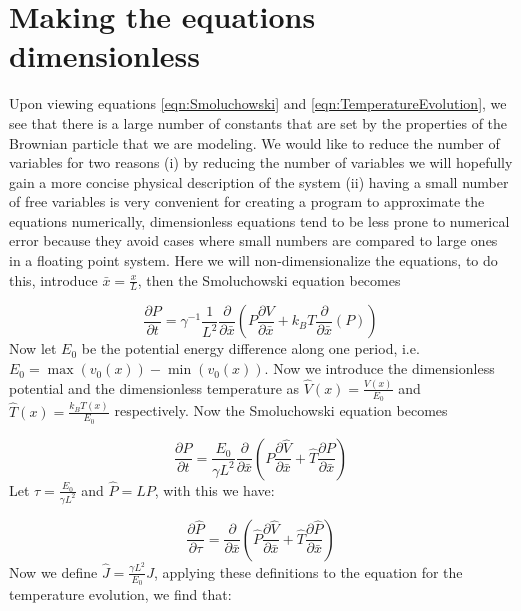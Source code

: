 \section{Making the equations dimensionless}  \label{dimensionless}

Upon viewing equations \ref{eqn:Smoluchowski} and \ref{eqn:TemperatureEvolution}, we see that there is a large number of constants that are set by the properties of the Brownian particle that we are modeling. We would like to reduce the number of variables for two reasons (i) by reducing the number of variables we will hopefully gain a more concise physical description of the system (ii) having a small number of free variables is very convenient for creating a program to approximate the equations numerically, dimensionless equations tend to be less prone to numerical error because they avoid cases where small numbers are compared to large ones in a floating point system.
Here we will non-dimensionalize the equations, to do this, introduce $\bar{x} = \frac{x}{L}$, then the Smoluchowski equation becomes

\begin{equation}
\frac{\partial P}{\partial t} = \gamma^{-1}\frac{1}{L^2} \frac{\partial}{\partial \bar{x}} \left (P \frac{\partial V}{\partial \bar{x}} + k_B T \frac{\partial}{\partial \bar{x}}(P) \right )
\end{equation}
Now let $E_0$ be the potential energy difference along one period, i.e. $E_0 = \max(v_0(x)) - \min(v_0(x))$. Now we introduce the dimensionless potential and the dimensionless temperature as $\hat{V}(x) = \frac{V(x)}{E_0}$ and $\hat{T}(x) = \frac{k_B T(x)}{E_0}$ respectively. Now the Smoluchowski equation becomes

\begin{equation}
\frac{\partial P}{\partial t} = \frac{E_0}{\gamma L^2} \frac{\partial}{\partial \bar{x}} \left (P \frac{\partial \hat{V}}{\partial \bar{x}} + \hat{T} \frac{\partial P}{\partial \bar{x}} \right )
\end{equation}
Let $\tau = \frac{E_0}{\gamma L^2}$ and $\hat{P} = L P $, with this we have:

\begin{equation}
\frac{\partial \hat{P}}{\partial \tau} = \frac{\partial}{\partial \bar{x}} \left (\hat{P} \frac{\partial \hat{V}}{\partial \bar{x}} + \hat{T}  \frac{\partial \hat{P}}{\partial \bar{x}} \right ) \label{eqn:dimensionlessSmoluchowski}
\end{equation}
Now we define $\hat{J} = \frac{\gamma L^2}{E_0} J $, applying these definitions to the equation for the temperature evolution, we find that:

